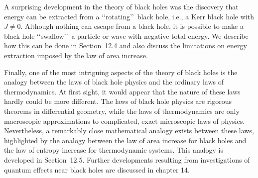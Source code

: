A surprising development in the theory of black holes was the discovery that energy
can be extracted from a \lq\lq rotating\rq\rq\ black hole, i.e., a Kerr black hole with
\(J\ne0\). Although nothing can escape from a black hole, it is possible to make a
black hole \lq\lq swallow\rq\rq\ a particle or wave with negative total energy. We
describe how this can be done in Section~12.4 and also discuss the limitations on
energy extraction imposed by the law of area increase.

Finally, one of the most intriguing aspects of the theory of black holes is the analogy
between the laws of black hole physics and the ordinary laws of thermodynamics. At
first sight, it would appear that the nature of these laws hardly could be more
different. The laws of black hole physics are rigorous theorems in differential
geometry, while the laws of thermodynamics are only macroscopic approximations to
complicated, exact microscopic laws of physics. Nevertheless, a remarkably close
mathematical analogy exists between these laws, highlighted by the analogy between
the law of area increase for black holes and the law of entropy increase for
thermodynamic systems. This analogy is developed in Section~12.5. Further
developments resulting from investigations of quantum effects near black holes are
discussed in chapter 14.
